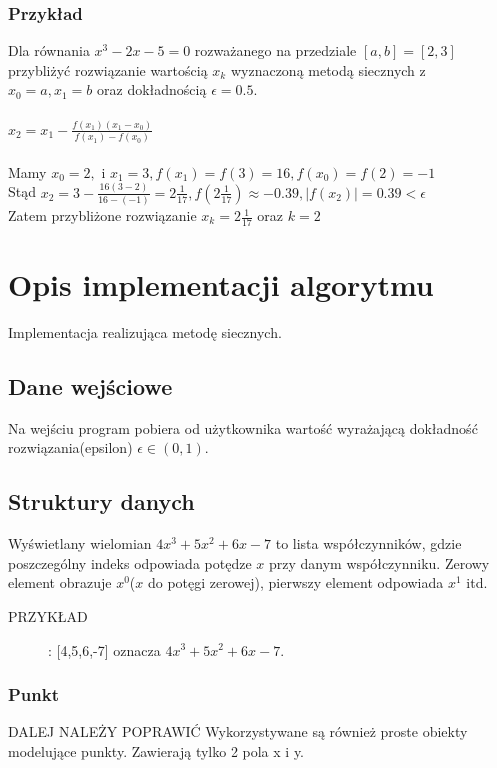 \documentclass[12pt]{article}
\begin{document}
\subsubsection{Przykład}
Dla równania $x^3-2x-5=0$ rozważanego na przedziale $[a,b]=[2,3]$ przybliżyć rozwiązanie wartością $x_k$ wyznaczoną metodą siecznych z\\
$x_0=a, x_1=b$ oraz dokładnością $\epsilon = 0.5.$
\\ \\
$ x_2=x_1 - \frac{f(x_1)(x_1-x_{0})}{f(x_1)-f(x_{0})}$
\\ \\
 Mamy $ x_{0}=2,$ i $x_{1}=3, f(x_1)=f(3)=16, f(x_0)=f(2)=-1$ 
\\Stąd $x_2=3-\frac{16(3-2)}{16-(-1)}=2 \frac{1}{17},f(2 \frac{1}{17})\approx-0.39, |f(x_2)|=0.39 < \epsilon$
\\Zatem przybliżone rozwiązanie $x_k=2 \frac{1}{17}$ oraz $k=2$
\section{Opis implementacji algorytmu}
Implementacja realizująca metodę siecznych.
\subsection{Dane wejściowe}
Na wejściu program pobiera od użytkownika wartość wyrażającą dokładność rozwiązania(epsilon) $\epsilon \in(0,1).$ 
\subsection{Struktury danych}

Wyświetlany wielomian $4x^{3} + 5x^{2} + 6x - 7$ to lista współczynników, gdzie poszczególny indeks odpowiada potędze $x$ przy danym współczynniku. Zerowy element obrazuje $ x^{0} $($x$ do potęgi zerowej), pierwszy element odpowiada $ x^{1} $ itd. 
\begin{description}
 
 \item[PRZYKŁAD]:\hspace{5 mm}  [4,5,6,-7] oznacza $4x^{3} + 5x^{2} + 6x - 7$.
 \\
\end{description}

\subsubsection{Punkt}
DALEJ NALEŻY POPRAWIĆ
Wykorzystywane są również proste obiekty modelujące punkty. Zawierają tylko 2 pola x i y.
\end{document}
